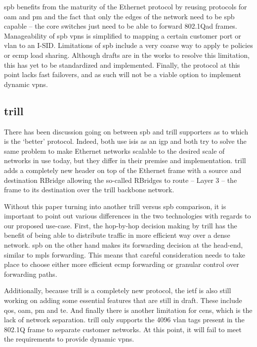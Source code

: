 \ac{spb} benefits from the maturity of the Ethernet protocol by reusing protocols for \ac{oam} and \ac{pm} and the fact that only the edges of the network need to be \ac{spb} capable -- the core switches just need to be able to forward 802.1Qad frames. Manageability of \ac{spb} \acp{vpn} is simplified to mapping a certain customer port or \ac{vlan} to an I-SID. Limitations of \ac{spb} include a very coarse way to apply \ac{te} policies or \ac{ecmp} load sharing. Although drafts are in the works to resolve this limitation, this has yet to be standardized and implemented. Finally, the protocol at this point lacks fast failovers, and as such will not be a viable option to implement dynamic \acp{vpn}.



\subsection{\acs{trill}} %
\label{sub:trill}
There has been discussion going on between \ac{spb} and \ac{trill} supporters as to which is the `better' protocol. Indeed, both use \ac{isis} as an \ac{igp} and both try to solve the same problem to make Ethernet networks scalable to the desired scale of networks in use today, but they differ in their premise and implementation. \ac{trill} adds a completely new header on top of  the Ethernet frame with a source and destination RBridge allowing the so-called RBridges to route -- Layer 3 -- the frame to its destination over the \ac{trill} backbone network.

Without this paper turning into another \ac{trill} versus \ac{spb} comparison, it is important to point out various differences in the two technologies with regards to our proposed use-case. First, the hop-by-hop decision making by \ac{trill} has the benefit of being able to distribute traffic in more efficient way over a dense network. \ac{spb} on the other hand makes its forwarding decision at the head-end, similar to \ac{mpls} forwarding. This means that careful consideration needs to take place to choose either more efficient \ac{ecmp} forwarding or granular control over forwarding paths. 

Additionally, because \ac{trill} is a completely new protocol, the \ac{ietf} is also still working on adding some essential features that are still in draft. These include \ac{qos}, \ac{oam}, \ac{pm} and \ac{te}. And finally there is another limitation for \acp{cen}, which is the lack of network separation. \ac{trill} only supports the 4096 \ac{vlan} tags present in the 802.1Q frame to separate customer networks. At this point, it will fail to meet the requirements to provide dynamic \acp{vpn}.

